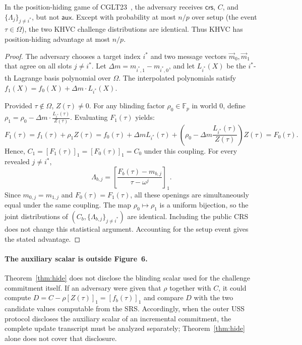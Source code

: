 \begin{theorem}
\label{thm:hide}
In the position-hiding game of CGLT23~\cite[Fig.~6, Def.~7]{CGLT23}, the adversary receives $\mathsf{crs}$, $C$, and $\{\Lambda_j\}_{j\neq i^*}$, but not $\mathsf{aux}$. Except with probability at most $n/p$ over setup (the event $\tau\in\Omega$), the two KHVC challenge distributions are identical. Thus KHVC has position-hiding advantage at most $n/p$.
\end{theorem}
\begin{proof}
The adversary chooses a target index $i^*$ and two message vectors $\vec{m}_0, \vec{m}_1$ that agree on all slots $j \neq i^*$. Let $\Delta m = m_{i^*,1} - m_{i^*,0}$, and let $L_{i^*}(X)$ be the $i^*$-th Lagrange basis polynomial over $\Omega$. The interpolated polynomials satisfy $f_1(X) = f_0(X) + \Delta m \cdot L_{i^*}(X)$.

Provided $\tau \notin \Omega$, $Z(\tau) \neq 0$. For any blinding factor $\rho_0 \in \mathbb{F}_p$ in world 0, define $\rho_1 = \rho_0 - \Delta m \cdot \frac{L_{i^*}(\tau)}{Z(\tau)}$. Evaluating $F_1(\tau)$ yields:
\[
F_1(\tau) = f_1(\tau) + \rho_1 Z(\tau) = f_0(\tau) + \Delta m L_{i^*}(\tau) + \left(\rho_0 - \Delta m \frac{L_{i^*}(\tau)}{Z(\tau)}\right) Z(\tau) = F_0(\tau).
\]
Hence, $C_1=[F_1(\tau)]_1=[F_0(\tau)]_1=C_0$ under this coupling. For every revealed $j\neq i^*$,
\[
 \Lambda_{b,j}=\left[\frac{F_b(\tau)-m_{b,j}}{\tau-\omega^j}\right]_1 .
\]
Since $m_{0,j}=m_{1,j}$ and $F_0(\tau)=F_1(\tau)$, all these openings are simultaneously equal under the same coupling. The map $\rho_0\mapsto\rho_1$ is a uniform bijection, so the joint distributions of $(C_b,\{\Lambda_{b,j}\}_{j\neq i^*})$ are identical. Including the public CRS does not change this statistical argument. Accounting for the setup event gives the stated advantage.
\end{proof}

\paragraph{The auxiliary scalar is outside Figure~6.}
Theorem~\ref{thm:hide} does not disclose the blinding scalar used for the challenge commitment itself. If an adversary were given that $\rho$ together with $C$, it could compute $D=C-\rho[Z(\tau)]_1=[f_b(\tau)]_1$ and compare $D$ with the two candidate values computable from the SRS. Accordingly, when the outer USS protocol discloses the auxiliary scalar of an incremental commitment, the complete update transcript must be analyzed separately; Theorem~\ref{thm:hide} alone does not cover that disclosure.



